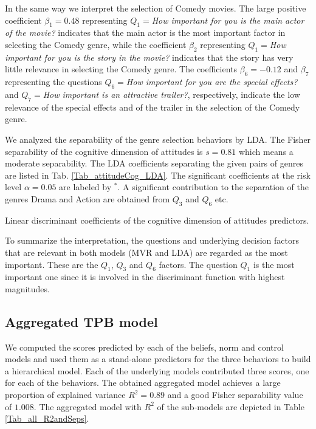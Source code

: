 \documentclass{llncs}
\def\a{{\alpha}}
\def\b{{\beta}}
\begin{document}
In the same way we interpret the selection of Comedy movies. The large positive coefficient $\b_1=0.48$ representing $Q_1=${\it How important for you is the main actor of the movie?} indicates that the main actor is the most important factor in selecting the Comedy genre, while the coefficient $\b_2$ representing $Q_1=${\it How important for you is the story in the movie?} indicates that the story has very little relevance in selecting the Comedy genre. The coefficients $\b_6=-0.12$ and $\b_7$ representing the questions $Q_6=${\it How important for you are the special effects?} and $Q_7=${\it How important is an attractive trailer?}, respectively, indicate the low relevance of the special effects and of the trailer in the selection of the Comedy genre. 

We analyzed the separability of the genre selection behaviors by LDA. The Fisher separability of the cognitive dimension of attitudes is $s = 0.81$ which means a moderate separability. The LDA coefficients separating the given pairs of genres are listed in Tab. \ref{Tab_attitudeCog_LDA}. The significant coefficients at the risk level $\a=0.05$ are labeled by $^*$. A significant contribution to the separation of the genres Drama and Action are obtained from $Q_3$ and $Q_6$ etc. 

\vspace*{-0.5em}
\begin{table}[!h]
  \centering
   
  \caption{Linear discriminant coefficients of the cognitive dimension of attitudes predictors.}
  \label{Tab_attitudeCog_LDA}
\end{table}
\vspace*{-0.5em}

To summarize the interpretation, the questions and underlying decision factors that are relevant in both models (MVR and LDA) are regarded as the most important. These are the $Q_1$, $Q_3$ and $Q_6$ factors. The question $Q_1$ is the most important one since it is involved in the discriminant function with highest magnitudes. 

\subsection{Aggregated TPB model}\label{SubSec_AggregateModel}

We computed the scores predicted by each of the beliefs, norm and control models and used them as a stand-alone predictors for the three behaviors to build a hierarchical model. Each of the underlying models contributed three scores, one for each of the behaviors. The obtained aggregated model achieves a large proportion of explained variance $R^2=0.89$ and a good Fisher separability value of $1.008$. The aggregated model with $R^2$ of the sub-models are depicted in Table \ref{Tab_all_R2andSeps}.
\end{document}
